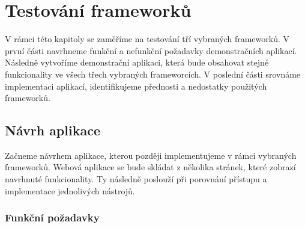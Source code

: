 \section{Testování frameworků}

V rámci této kapitoly se zaměříme na testování tří vybraných frameworků. V první části navrhneme funkční a nefunkční požadavky demonstračních aplikací. 
Následně vytvoříme demonstrační aplikaci, která bude obsahovat stejné funkcionality ve všech třech vybraných frameworcích. 
V poslední části srovnáme implementaci aplikací, identifikujeme přednosti a nedostatky použitých frameworků. 

\subsection{Návrh aplikace}

Začneme návrhem aplikace, kterou později implementujeme v rámci vybraných frameworků. 
Webová aplikace se bude skládat z několika stránek, které zobrazí navrhnuté funkcionality. 
Ty následně poslouží při porovnání přístupu a implementace jednolivých nástrojů.

\subsubsection{Funkční požadavky}

